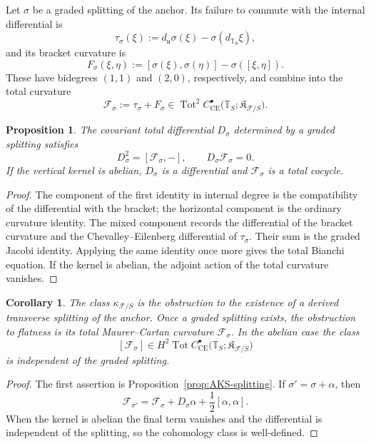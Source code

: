 \documentclass[11pt,reqno,a4paper,dvipsnames,x11names]{amsart}
\numberwithin{equation}{section}
\theoremstyle{plain}
\newtheorem{proposition}[theorem]{Proposition}
\newtheorem{corollary}[theorem]{Corollary}
\theoremstyle{definition}
\theoremstyle{remark}
\DeclareMathOperator{\Tot}{Tot}
\newcommand{\cF}{\mathcal F}
\newcommand{\bbT}{\mathbb T}
\begin{document}
Let \(\sigma\) be a graded splitting of the anchor. Its failure to commute with the internal differential is
\[
 \tau_\sigma(\xi)
 :=d_{\mathfrak u}\sigma(\xi)-\sigma(d_{\bbT_S}\xi),
\]
and its bracket curvature is
\[
 F_\sigma(\xi,\eta)
 :=[\sigma(\xi),\sigma(\eta)]-\sigma([\xi,\eta]).
\]
These have bidegrees \((1,1)\) and \((2,0)\), respectively, and combine into the total curvature
\[
 \mathcal F_\sigma:=\tau_\sigma+F_\sigma
 \in
 \Tot^2 C^\bullet_{\mathrm{CE}}
 \bigl(\bbT_S;\mathfrak K_{\cF/S}\bigr).
\]

\begin{proposition}\label{prop:AKS-bianchi}
The covariant total differential \(D_\sigma\) determined by a graded splitting satisfies
\[
 D_\sigma^2=[\mathcal F_\sigma,-],
 \qquad
 D_\sigma\mathcal F_\sigma=0.
\]
If the vertical kernel is abelian, \(D_\sigma\) is a differential and \(\mathcal F_\sigma\) is a total cocycle.
\end{proposition}

\begin{proof}
The component of the first identity in internal degree is the compatibility of the differential with the bracket; the horizontal component is the ordinary curvature identity. The mixed component records the differential of the bracket curvature and the Chevalley--Eilenberg differential of \(\tau_\sigma\). Their sum is the graded Jacobi identity. Applying the same identity once more gives the total Bianchi equation. If the kernel is abelian, the adjoint action of the total curvature vanishes.
\end{proof}

\begin{corollary}\label{cor:AKS-obstructions}
The class \(\kappa_{\cF/S}\) is the obstruction to the existence of a derived transverse splitting of the anchor. Once a graded splitting exists, the obstruction to flatness is its total Maurer--Cartan curvature \(\mathcal F_\sigma\). In the abelian case the class
\[
 [\mathcal F_\sigma]
 \in
 H^2\Tot C^\bullet_{\mathrm{CE}}
 \bigl(\bbT_S;\mathfrak K_{\cF/S}\bigr)
\]
is independent of the graded splitting.
\end{corollary}

\begin{proof}
The first assertion is Proposition~\ref{prop:AKS-splitting}. If
\(\sigma'=\sigma+\alpha\), then
\[
 \mathcal F_{\sigma'}
 =\mathcal F_\sigma+D_\sigma\alpha
  +\frac12[\alpha,\alpha].
\]
When the kernel is abelian the final term vanishes and the differential is independent of the splitting, so the cohomology class is well-defined.
\end{proof}
\end{document}
